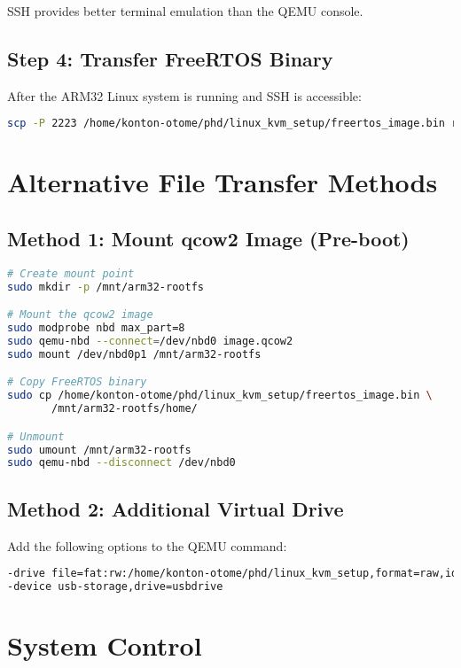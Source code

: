 \documentclass{article}
\begin{document}
SSH provides better terminal emulation than the QEMU console.

\subsection{Step 4: Transfer FreeRTOS Binary}

After the ARM32 Linux system is running and SSH is accessible:

\begin{lstlisting}[language=bash]
scp -P 2223 /home/konton-otome/phd/linux_kvm_setup/freertos_image.bin root@localhost:/home/
\end{lstlisting}

\section{Alternative File Transfer Methods}

\subsection{Method 1: Mount qcow2 Image (Pre-boot)}

\begin{lstlisting}[language=bash]
# Create mount point
sudo mkdir -p /mnt/arm32-rootfs

# Mount the qcow2 image
sudo modprobe nbd max_part=8
sudo qemu-nbd --connect=/dev/nbd0 image.qcow2
sudo mount /dev/nbd0p1 /mnt/arm32-rootfs

# Copy FreeRTOS binary
sudo cp /home/konton-otome/phd/linux_kvm_setup/freertos_image.bin \
       /mnt/arm32-rootfs/home/

# Unmount
sudo umount /mnt/arm32-rootfs
sudo qemu-nbd --disconnect /dev/nbd0
\end{lstlisting}

\subsection{Method 2: Additional Virtual Drive}

Add the following options to the QEMU command:

\begin{lstlisting}[language=bash]
-drive file=fat:rw:/home/konton-otome/phd/linux_kvm_setup,format=raw,id=usbdrive \
-device usb-storage,drive=usbdrive
\end{lstlisting}

\section{System Control}
\end{document}
